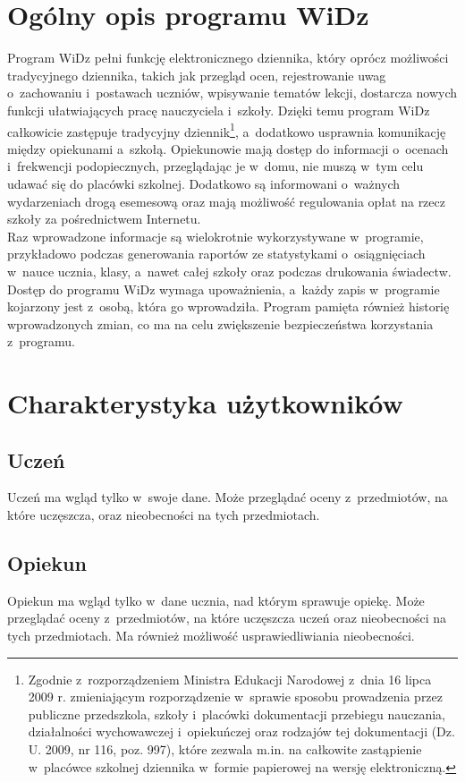 \documentclass[12pt,leqno,twoside]{mwart}
\begin{document}
\section{Ogólny opis programu WiDz}
\noindent Program WiDz pełni funkcję elektronicznego dziennika, który oprócz możliwości tradycyjnego dziennika, takich jak przegląd ocen, rejestrowanie uwag o~zachowaniu i~postawach uczniów, wpisywanie tematów lekcji, dostarcza nowych funkcji ułatwiających pracę nauczyciela i~szkoły. Dzięki temu program WiDz całkowicie zastępuje tradycyjny dziennik\footnote{Zgodnie z~rozporządzeniem Ministra Edukacji Narodowej z~dnia 16 lipca 2009 r. zmieniającym rozporządzenie w~sprawie sposobu prowadzenia przez publiczne przedszkola, szkoły i~placówki dokumentacji przebiegu nauczania, działalności wychowawczej i~opiekuńczej oraz rodzajów tej dokumentacji (Dz. U. 2009, nr 116, poz. 997), które zezwala m.in. na całkowite zastąpienie w~placówce szkolnej dziennika w~formie papierowej na wersję elektroniczną.}, a~dodatkowo usprawnia komunikację między opiekunami a~szkołą. Opiekunowie mają dostęp do informacji o~ocenach i~frekwencji podopiecznych, przeglądając je w~domu, nie muszą w~tym celu udawać się do placówki szkolnej. Dodatkowo są informowani o~ważnych wydarzeniach drogą esemesową oraz mają możliwość regulowania opłat na rzecz szkoły za pośrednictwem Internetu.\\
\indent Raz wprowadzone informacje są wielokrotnie wykorzystywane w~programie, przykładowo podczas generowania raportów ze statystykami o~osiągnięciach w~nauce ucznia, klasy, a~nawet całej szkoły oraz podczas drukowania świadectw.\\
\indent Dostęp do programu WiDz wymaga upoważnienia, a~każdy zapis w~programie  kojarzony jest z~osobą, która go wprowadziła. Program pamięta również historię wprowadzonych zmian, co ma na celu zwiększenie bezpieczeństwa korzystania z~programu.

\section{Charakterystyka użytkowników}\label{CHARAKTER_UZYTK}
\subsection{Uczeń}
\noindent Uczeń ma wgląd tylko w~swoje dane. Może przeglądać oceny z~przedmiotów, na które uczęszcza, oraz nieobecności na tych przedmiotach.

\subsection{Opiekun}
\noindent Opiekun ma wgląd tylko w~dane ucznia, nad którym sprawuje opiekę. Może przeglądać oceny z~przedmiotów, na które uczęszcza uczeń oraz nieobecności na tych przedmiotach. Ma również możliwość usprawiedliwiania nieobecności.
\end{document}
